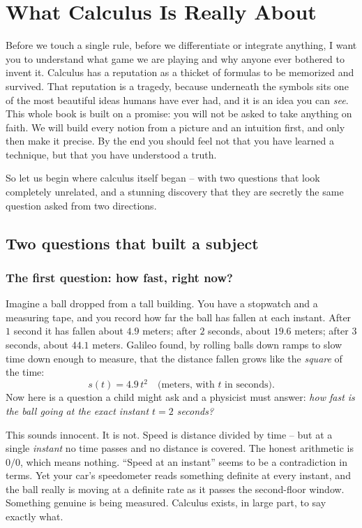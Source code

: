 \chapter{What Calculus Is Really About}

Before we touch a single rule, before we differentiate or integrate anything,
I want you to understand what game we are playing and why anyone ever bothered
to invent it. Calculus has a reputation as a thicket of formulas to be
memorized and survived. That reputation is a tragedy, because underneath the
symbols sits one of the most beautiful ideas humans have ever had, and it is an
idea you can \emph{see}. This whole book is built on a promise: you will not be
asked to take anything on faith. We will build every notion from a picture and
an intuition first, and only then make it precise. By the end you should feel
not that you have learned a technique, but that you have understood a truth.

So let us begin where calculus itself began -- with two questions that look
completely unrelated, and a stunning discovery that they are secretly the same
question asked from two directions.

\section{Two questions that built a subject}

\subsection{The first question: how fast, right now?}

Imagine a ball dropped from a tall building. You have a stopwatch and a measuring
tape, and you record how far the ball has fallen at each instant. After $1$
second it has fallen about $4.9$ meters; after $2$ seconds, about $19.6$ meters;
after $3$ seconds, about $44.1$ meters. Galileo found, by rolling balls down
ramps to slow time down enough to measure, that the distance fallen grows like
the \emph{square} of the time:
\[
  s(t) = 4.9\,t^2 \quad\text{(meters, with $t$ in seconds).}
\]
Now here is a question a child might ask and a physicist must answer: \emph{how
fast is the ball going at the exact instant $t = 2$ seconds?}

This sounds innocent. It is not. Speed is distance divided by time -- but at a
single \emph{instant} no time passes and no distance is covered. The honest
arithmetic is $0/0$, which means nothing. ``Speed at an instant'' seems to be a
contradiction in terms. Yet your car's speedometer reads something definite at
every instant, and the ball really is moving at a definite rate as it passes the
second-floor window. Something genuine is being measured. Calculus exists, in
large part, to say exactly what.


